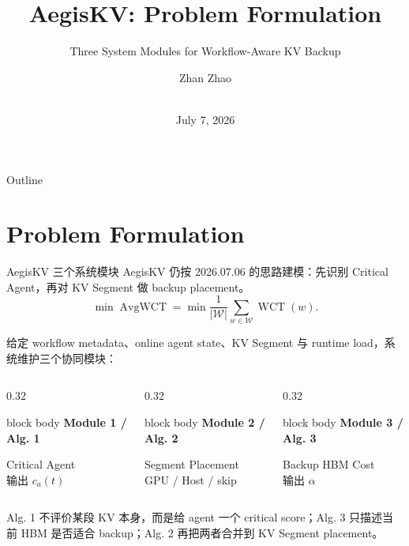 \documentclass[aspectratio=43]{beamer}
\title{AegisKV: Problem Formulation}
\subtitle{Three System Modules for Workflow-Aware KV Backup}
\author[Z Zhao]{Zhan Zhao}
\institute[HKBU]{Hong Kong Baptist University}
\date[2026.07.07]{\meetingname\\July 7, 2026}
\newcommand{\smallcard}[2]{%
  \begin{beamercolorbox}[wd=\textwidth,rounded=true,shadow=false,sep=1.0ex]{block body}
    \textbf{#1}\par
    \vspace{0.25ex}
    \scriptsize #2
  \end{beamercolorbox}
}
\begin{document}
\begin{frame}[plain]
  \titlepage
\end{frame}

\begin{frame}{Outline}
  \tableofcontents
\end{frame}

\section{Problem Formulation}

\begin{frame}{AegisKV 三个系统模块}
  \small
  AegisKV 仍按 2026.07.06 的思路建模：先识别 Critical Agent，再对 KV Segment 做 backup placement。
  \[
    \min \operatorname{AvgWCT}
    =
    \min \frac{1}{|\mathcal{W}|}\sum_{w\in\mathcal{W}}\operatorname{WCT}(w).
  \]

  \vspace{0.08cm}
  给定 workflow metadata、online agent state、KV Segment 与 runtime load，系统维护三个协同模块：

  \vspace{0.10cm}
  \begin{columns}[T,onlytextwidth]
    \begin{column}{0.32\textwidth}
      \smallcard{Module 1 / Alg. 1}{Critical Agent\\输出 $c_a(t)$}
    \end{column}
    \begin{column}{0.32\textwidth}
      \smallcard{Module 2 / Alg. 2}{Segment Placement\\GPU / Host / skip}
    \end{column}
    \begin{column}{0.32\textwidth}
      \smallcard{Module 3 / Alg. 3}{Backup HBM Cost\\输出 $\alpha$}
    \end{column}
  \end{columns}

  \vspace{0.12cm}
  \footnotesize
  Alg. 1 不评价某段 KV 本身，而是给 agent 一个 critical score；Alg. 3 只描述当前 HBM 是否适合 backup；Alg. 2 再把两者合并到 KV Segment placement。
\end{frame}
\end{document}
